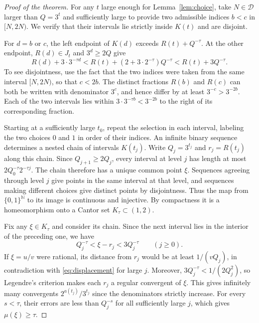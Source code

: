 \documentclass[11pt,reqno]{amsart}
\theoremstyle{definition}
\newcommand{\N}{\mathbb N}
\newcommand{\DD}{\mathcal D}
\begin{document}
\begin{proof}[Proof of the theorem]
For any $t$ large enough for Lemma~\ref{lem:choice}, take
$N\in\DD$ larger than $Q=3^t$ and sufficiently large to provide
two admissible indices $b<c$ in $[N,2N)$. We verify that their
intervals lie strictly inside $K(t)$ and are disjoint.

For $d=b$ or $c$, the left endpoint of $K(d)$ exceeds $R(t)+Q^{-\tau}$.
At the other endpoint, $R(d)\in J_t$ and $3^d\ge2Q$ give
\[
 R(d)+3\cdot3^{-\tau d}
 <R(t)+(2+3\cdot2^{-\tau})Q^{-\tau}<R(t)+3Q^{-\tau}.
\]
To see disjointness, use the fact that the two indices were taken
from the same interval $[N,2N)$, so that $c<2b$. The distinct
fractions $R(b)$ and $R(c)$ can both be written with denominator
$3^c$, and hence differ by at least $3^{-c}>3^{-2b}$. Each of the
two intervals lies within $3\cdot3^{-\tau b}<3^{-2b}$ to the right of
its corresponding fraction.

Starting at a sufficiently large $t_0$, repeat the selection in
each interval, labeling the two choices $0$ and $1$ in order of
their indices. An infinite binary sequence determines a nested
chain of intervals $K(t_j)$. Write $Q_j=3^{t_j}$ and $r_j=R(t_j)$
along this chain. Since $Q_{j+1}\ge2Q_j$, every interval at level
$j$ has length at most $2Q_0^{-\tau}2^{-\tau j}$. The chain therefore
has a unique common point $\xi$. Sequences agreeing through level $j$
give points in the same interval at that level, and sequences making
different choices give distinct points by disjointness. Thus the map
from $\{0,1\}^{\N}$ to its image is continuous and injective. By
compactness it is a homeomorphism onto a Cantor set $K_\tau\subset(1,2)$.

Fix any $\xi\in K_\tau$ and consider its chain. Since the next interval
lies in the interior of the preceding one, we have
\begin{equation}\label{eq:displacement}
 Q_j^{-\tau}<\xi-r_j<3Q_j^{-\tau}\qquad(j\ge0).
\end{equation}
If $\xi=u/v$ were rational, its distance from $r_j$ would be at
least $1/(vQ_j)$, in contradiction with \eqref{eq:displacement} for
large $j$. Moreover, $3Q_j^{-\tau}<1/(2Q_j^2)$, so Legendre's
criterion \cite[Theorem~1.8, p.~10]{Bugeaud} makes each $r_j$ a
regular convergent of $\xi$. This gives infinitely many convergents
$2^{a(t_j)}/3^{t_j}$ since the denominators strictly increase.
For every $s<\tau$, their errors are less
than $Q_j^{-s}$ for all sufficiently large $j$, which gives
$\mu(\xi)\ge\tau$.


\end{proof}
\end{document}
